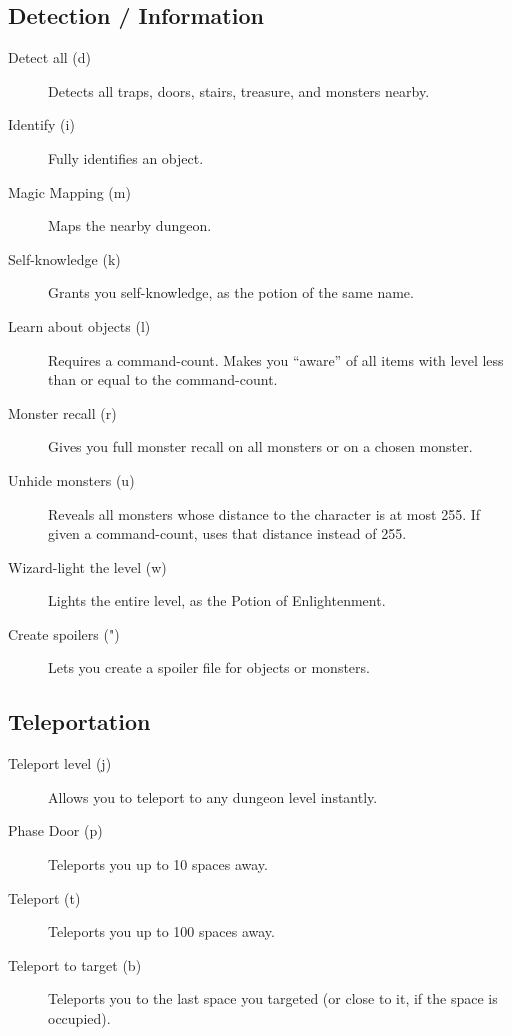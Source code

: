 \subsection{Detection / Information}
\begin{description}
\item[Detect all (d)]
    Detects all traps, doors, stairs, treasure, and monsters nearby.

\item[Identify (i)]
    Fully identifies an object.

\item[Magic Mapping (m)]
    Maps the nearby dungeon.

\item[Self-knowledge (k)]
    Grants you self-knowledge, as the potion of the same name.

\item[Learn about objects (l)]
    Requires a command-count. Makes you ``aware'' of all items with level
    less than or equal to the command-count.

\item[Monster recall (r)]
    Gives you full monster recall on all monsters or on a chosen monster.

\item[Unhide monsters (u)]
    Reveals all monsters whose distance to the character is at most 255.
    If given a command-count, uses that distance instead of 255.

\item[Wizard-light the level (w)]
    Lights the entire level, as the Potion of Enlightenment.

\item[Create spoilers (")]
    Lets you create a spoiler file for objects or monsters.
\end{description}

\subsection{Teleportation}
\begin{description}
\item[Teleport level (j)]
    Allows you to teleport to any dungeon level instantly.

\item[Phase Door (p)]
    Teleports you up to 10 spaces away.

\item[Teleport (t)]
    Teleports you up to 100 spaces away.

\item[Teleport to target (b)]
    Teleports you to the last space you targeted (or close to it, if the
    space is occupied).
\end{description}

